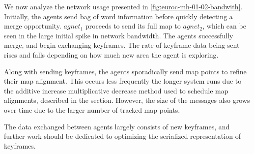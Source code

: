 We now analyze the network usage presented in \autoref{fig:euroc-mh-01-02-bandwith}. Initially, the agents send bag of word information before quickly detecting a merge opportunity. $agnet_1$ proceeds to send its full map to $agnet_2$, which can be seen in the large initial spike in network bandwidth. The agents successfully merge, and begin exchanging keyframes. The rate of keyframe data being sent rises and falls depending on how much new area the agent is exploring.

Along with sending keyframes, the agents sporadically send map points to refine their map alignment. This occurs less frequently the longer system runs due to the additive increase multiplicative decrease method used to schedule map alignments, described in the  section. However, the size of the messages also grows over time due to the larger number of tracked map points.

The data exchanged between agents largely consists of new keyframes, and further work should be dedicated to optimizing the serialized representation of keyframes.

